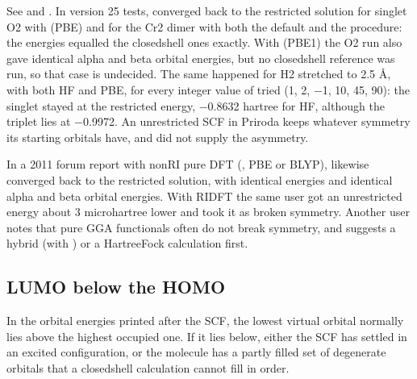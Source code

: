 \documentclass[letterpaper,10pt,english,openany,oneside]{sphinxmanual}
\begin{document}
\sphinxAtStartPar
See {\hyperref[\detokenize{reference/scf:scf-restrict}]{}} and {\hyperref[\detokenize{reference/guess:guess-mix}]{}}. In version 25 tests,  converged back
to the restricted solution for singlet O2 with  (PBE) and for the Cr2 dimer with both the default and the
 procedure: the energies equalled the closed\sphinxhyphen{}shell ones exactly. With  (PBE1) the O2 run also gave
identical alpha and beta orbital energies, but no closed\sphinxhyphen{}shell reference was run, so that case is undecided. The same
happened for H2 stretched to 2.5 Å, with both HF and PBE, for every integer value of  tried (1, 2, −1, 10, 45,
90): the singlet stayed at the restricted energy, −0.8632 hartree for HF, although the triplet lies at −0.9972. An
unrestricted SCF in Priroda keeps whatever symmetry its starting orbitals have, and  did not supply the
asymmetry.



\sphinxAtStartPar
In a 2011 forum report with non\sphinxhyphen{}RI pure DFT (, PBE or BLYP),  likewise converged back
to the restricted solution, with identical energies and identical alpha and beta orbital energies. With RI\sphinxhyphen{}DFT the
same user got an unrestricted energy about 3 microhartree lower and took it as broken symmetry. Another user notes
that pure GGA functionals often do not break symmetry, and suggests a hybrid (with ) or a Hartree\textendash{}Fock
calculation first.




\subsection{LUMO below the HOMO}
\label{\detokenize{troubleshooting/common-problems:lumo-below-the-homo}}\label{\detokenize{troubleshooting/common-problems:troubleshooting-lumo-below-homo}}
\sphinxAtStartPar
In the orbital energies printed after the SCF, the lowest virtual orbital normally lies above the highest occupied
one. If it lies below, either the SCF has settled in an excited configuration, or the molecule has a partly filled
set of degenerate orbitals that a closed\sphinxhyphen{}shell calculation cannot fill in order.
\end{document}
